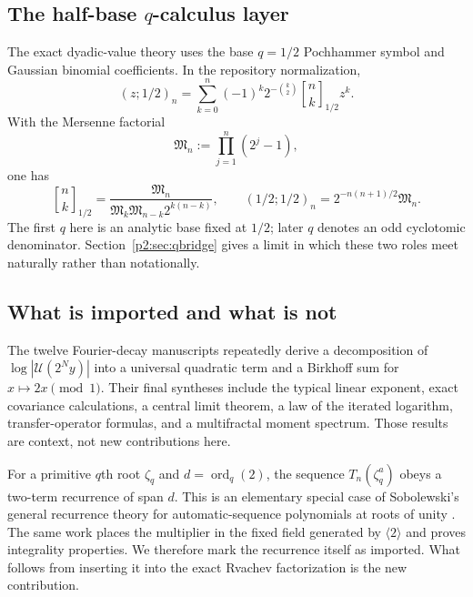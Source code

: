 \documentclass[11pt,oneside]{article}
\theoremstyle{definition}
\theoremstyle{remark}
\newcommand{\ord}{\operatorname{ord}}
\newcommand{\qbinom}[3]{\genfrac{[}{]}{0pt}{}{#1}{#2}_{#3}}
\begin{document}
\subsection{The half-base $q$-calculus layer}

The exact dyadic-value theory uses the base $q=1/2$ Pochhammer symbol and Gaussian
binomial coefficients. In the repository normalization,
\begin{equation}
 (z;1/2)_n=\sum_{k=0}^n(-1)^k2^{-\binom{k}{2}}
 \qbinom{n}{k}{1/2}z^k.
 \label{p2:eq:qbinom-expansion}
\end{equation}
With the Mersenne factorial
\begin{equation}
 \mathfrak M_n:=\prod_{j=1}^n(2^j-1),
 \label{p2:eq:Mersenne-factorial}
\end{equation}
one has
\begin{equation}
 \qbinom{n}{k}{1/2}
 =\frac{\mathfrak M_n}{\mathfrak M_k\mathfrak M_{n-k}2^{k(n-k)}},
 \qquad
 (1/2;1/2)_n=2^{-n(n+1)/2}\mathfrak M_n.
 \label{p2:eq:Mersenne-qbinom}
\end{equation}
The first $q$ here is an analytic base fixed at $1/2$; later $q$ denotes an odd
cyclotomic denominator. Section~\ref{p2:sec:qbridge} gives a limit in which these two
roles meet naturally rather than notationally.

\subsection{What is imported and what is not}

The twelve Fourier-decay manuscripts repeatedly derive a decomposition of
$\log|\mathscr U(2^Ny)|$ into a universal quadratic term and a Birkhoff sum for
$x\mapsto2x\pmod1$. Their final syntheses include the typical linear exponent,
exact covariance calculations, a central limit theorem, a law of the iterated
logarithm, transfer-operator formulas, and a multifractal moment spectrum. Those
results are context, not new contributions here.

For a primitive $q$th root $\zeta_q$ and $d=\ord_q(2)$, the sequence
$T_n(\zeta_q^a)$ obeys a two-term recurrence of span $d$. This is an elementary
special case of Sobolewski's general recurrence theory for automatic-sequence
polynomials at roots of unity \cite{p2:sobolewski2019}. The same work places the
multiplier in the fixed field generated by $\langle2\rangle$ and proves integrality
properties. We therefore mark the recurrence itself as imported. What follows from
inserting it into the exact Rvachev factorization is the new contribution.
\end{document}
